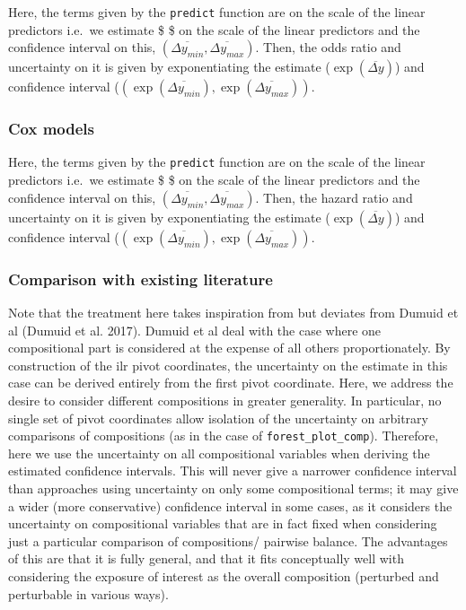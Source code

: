 \documentclass[
]{article}
\begin{document}
Here, the terms given by the \texttt{predict} function are on the scale
of the linear predictors i.e.~we estimate \$  \$ on
the scale of the linear predictors and the confidence interval on this,
\((\overline{\Delta y_{min}}, \overline{\Delta y_{max}})\). Then, the
odds ratio and uncertainty on it is given by exponentiating the estimate
(\(\exp(\overline{\Delta y})\)) and confidence interval
(\((\exp(\overline{\Delta y_{min}}), \exp(\overline{\Delta y_{max}}))\).

\hypertarget{cox-models}{%
\subsubsection{Cox models}\label{cox-models}}

Here, the terms given by the \texttt{predict} function are on the scale
of the linear predictors i.e.~we estimate \$  \$ on
the scale of the linear predictors and the confidence interval on this,
\((\overline{\Delta y_{min}}, \overline{\Delta y_{max}})\). Then, the
hazard ratio and uncertainty on it is given by exponentiating the
estimate (\(\exp(\overline{\Delta y})\)) and confidence interval
(\((\exp(\overline{\Delta y_{min}}), \exp(\overline{\Delta y_{max}}))\).

\hypertarget{comparison-with-existing-literature}{%
\subsubsection{Comparison with existing
literature}\label{comparison-with-existing-literature}}

Note that the treatment here takes inspiration from but deviates from
Dumuid et al (Dumuid et al. 2017). Dumuid et al deal with the case where
one compositional part is considered at the expense of all others
proportionately. By construction of the ilr pivot coordinates, the
uncertainty on the estimate in this case can be derived entirely from
the first pivot coordinate. Here, we address the desire to consider
different compositions in greater generality. In particular, no single
set of pivot coordinates allow isolation of the uncertainty on arbitrary
comparisons of compositions (as in the case of
\texttt{forest\_plot\_comp}). Therefore, here we use the uncertainty on
all compositional variables when deriving the estimated confidence
intervals. This will never give a narrower confidence interval than
approaches using uncertainty on only some compositional terms; it may
give a wider (more conservative) confidence interval in some cases, as
it considers the uncertainty on compositional variables that are in fact
fixed when considering just a particular comparison of compositions/
pairwise balance. The advantages of this are that it is fully general,
and that it fits conceptually well with considering the exposure of
interest as the overall composition (perturbed and perturbable in
various ways).
\end{document}
